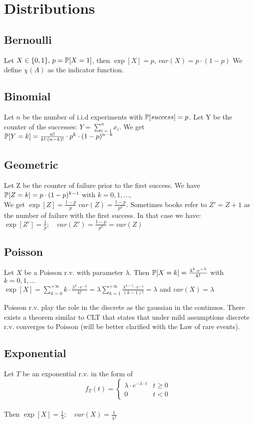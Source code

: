 \section{Distributions}
\subsection{Bernoulli}
Let $X \in \{0,1\}, \, p = \mathbb{P}[X=1]$, then $\exp[X]=p, \, var(X)=p \cdot (1-p)$
We define $\chi(A)$ as the indicator function.

\subsection{Binomial}
Let $n$ be the number of i.i.d experiments with $\mathbb{P}[success]=p$. Let Y be the counter of the successes:
$Y=\sum\limits_{i=1}^{n} x_i$. We get $\mathbb{P}[Y=k]= \frac{n!}{k! \cdot (n-k)!}\cdot p^k \cdot (1-p)^{n-k}$

\subsection{Geometric}
Let Z be the counter of failure prior to the first success. We have $\mathbb{P}[Z=k] = p \cdot (1-p)^{k-1}$ with $k=0,1,\dots$, \\
We get $\exp[Z]=\frac{1-p}{p} \; var(Z)=\frac{1-p}{p^2}$.
Sometimes books refer to $Z'=Z+1$ as the number of failure with the first success. In that case we have:\\
$\exp[Z']=\frac{1}{p}; \quad var(Z')=\frac{1-p}{p^2}=var(Z)$

\subsection{Poisson}
Let $X$ be a Poisson r.v. with parameter $\lambda$. Then $\mathbb{P}[X=k] =  \frac{\lambda^k \cdot e^{-\lambda}}{k!}$ with $k=0,1,\dots$
\\
$\exp[X]=\sum\limits_{k=0}^{+\infty}k \cdot \frac{\lambda^k \cdot e^{-\lambda}}{k!}= \lambda \sum\limits_{k=1}^{+\infty}\frac{\lambda^{k-1}\cdot e^{-\lambda}}{(k-1)!}=\lambda$
and $var(X)=\lambda$

Poisson r.v. play the role in the discrete as the gaussian in the continuos. There exists a theorem similar to CLT that states that under mild assumptions discrete r.v. converges to Poisson (will be better clarified with the Law of rare events).

\subsection{Exponential}
Let $T$ be an exponential r.v. in the form of
$$f_T(t)=
\begin{cases}
  \lambda \cdot e^{-\lambda \cdot t} & t \ge 0 \\
  0 & t <0
\end{cases}
$$
\\
Then $\exp[X]= \frac{1}{\lambda}; \quad var(X)=\frac{1}{\lambda^2}$

